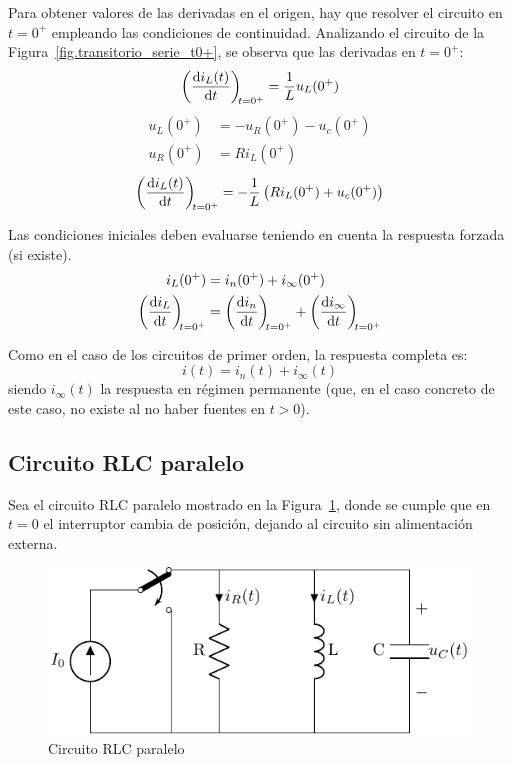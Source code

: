 Para obtener valores de las derivadas en el origen, hay que resolver el circuito en \(t = 0^+\) empleando las condiciones de continuidad. Analizando el circuito de la Figura~\ref{fig.transitorio_serie_t0+}, se observa que las derivadas en $t=0^+$:
\[
  \diff{i_L(t)}{t}[t = 0^+] = \frac{1}{L} u_L(0^+)
\]
\begin{align*}
  u_L(0^+) &= -u_R(0^+) - u_c(0^+)\\
  u_R(0^+) &= R i_L(0^+)
\end{align*}
\[
{\diff{i_L(t)}{t}[t = 0^+] = - \frac{1}{L}\left(R i_L(0^+) + u_c(0^+)\right)}
\]
\begin{remark}
Las condiciones iniciales deben evaluarse teniendo en cuenta la respuesta forzada (si existe).
\begin{align*}
  i_L(0^+) &= i_n(0^+) + i_{\infty}(0^+)\\
  \diff{i_L}{t}[t = 0^+] &= \diff{i_n}{t}[t = 0^+] + \diff{i_{\infty}}{t}[t = 0^+]  
\end{align*}
\end{remark}
Como en el caso de los circuitos de primer orden, la respuesta completa es: 
\begin{equation*}
    i(t)=i_n(t)+i_\infty(t)
\end{equation*}
siendo $i_\infty(t)$ la respuesta en régimen permanente (que, en el caso concreto de este caso, no existe al no haber fuentes en $t>0$). 

\subsection{Circuito RLC paralelo}

Sea el circuito RLC paralelo mostrado en la Figura~\ref{fig.transitorio_circuito_RLC_paralelo}, donde se cumple que en $t = 0$ el interruptor cambia de posición, dejando al circuito sin alimentación externa. 
\begin{figure}[H]
    \centering
    \includegraphics{../figs/transitorio_circuitoRLC_paralelo.pdf}
    \caption{Circuito RLC paralelo}
    \label{fig.transitorio_circuito_RLC_paralelo}
\end{figure}

